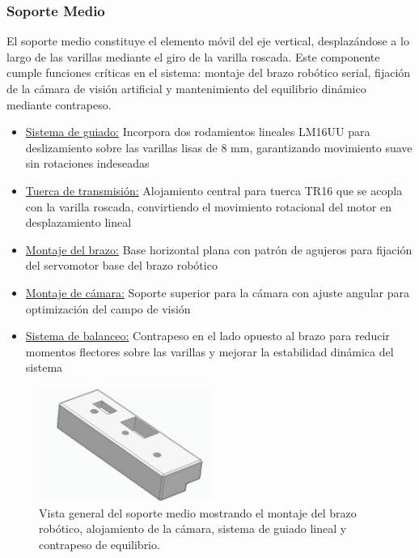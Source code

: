 \subsubsection{Soporte Medio}

El soporte medio constituye el elemento móvil del eje vertical, desplazándose a lo largo de las varillas mediante el giro de la varilla roscada. Este componente cumple funciones críticas en el sistema: montaje del brazo robótico serial, fijación de la cámara de visión artificial y mantenimiento del equilibrio dinámico mediante contrapeso.

\begin{itemize}[label=$\bullet$]
    \item \underline{Sistema de guiado:} Incorpora dos rodamientos lineales LM16UU para deslizamiento sobre las varillas lisas de 8 mm, garantizando movimiento suave sin rotaciones indeseadas
    \item \underline{Tuerca de transmisión:} Alojamiento central para tuerca TR16 que se acopla con la varilla roscada, convirtiendo el movimiento rotacional del motor en desplazamiento lineal
    \item \underline{Montaje del brazo:} Base horizontal plana con patrón de agujeros para fijación del servomotor base del brazo robótico
    \item \underline{Montaje de cámara:} Soporte superior para la cámara con ajuste angular para optimización del campo de visión
    \item \underline{Sistema de balanceo:} Contrapeso en el lado opuesto al brazo para reducir momentos flectores sobre las varillas y mejorar la estabilidad dinámica del sistema
\end{itemize}

\begin{figure}[H]
    \centering
    \includegraphics[width=0.5\textwidth]{img/MedioReal_simplificado_vista.jpg}
    \caption{Vista general del soporte medio mostrando el montaje del brazo robótico, alojamiento de la cámara, sistema de guiado lineal y contrapeso de equilibrio.}
    \label{fig:soporte_medio_Real}
\end{figure}

